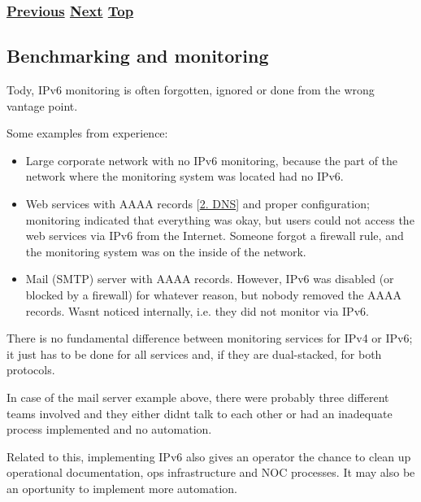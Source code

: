 \documentclass[
]{article}
\begin{document}
\subsubsection{\texorpdfstring{\hyperref[address-and-prefix-management]{Previous}
\hyperref[benchmarking-and-monitoring]{Next}
\hyperref[management-and-operations]{Top}}{Previous Next Top}}\label{previous-next-top-26}

\pagebreak

\subsection{Benchmarking and
monitoring}\label{benchmarking-and-monitoring}

Tody, IPv6 monitoring is often forgotten, ignored or done from the wrong
vantage point.

Some examples from experience:

\begin{itemize}
\item
  Large corporate network with no IPv6 monitoring, because the part of
  the network where the monitoring system was located had no IPv6.
\item
  Web services with AAAA records {[}\hyperref[dns]{2. DNS}{]} and proper
  configuration; monitoring indicated that everything was okay, but
  users could not access the web services via IPv6 from the Internet.
  Someone forgot a firewall rule, and the monitoring system was on the
  inside of the network.
\item
  Mail (SMTP) server with AAAA records. However, IPv6 was disabled (or
  blocked by a firewall) for whatever reason, but nobody removed the
  AAAA records. Wasn\textquotesingle t noticed internally, i.e. they did
  not monitor via IPv6.
\end{itemize}

There is no fundamental difference between monitoring services for IPv4
or IPv6; it just has to be done for all services and, if they are
dual-stacked, for both protocols.

In case of the mail server example above, there were probably three
different teams involved and they either didn\textquotesingle t talk to
each other or had an inadequate process implemented and no automation.

Related to this, implementing IPv6 also gives an operator the chance to
clean up operational documentation, ops infrastructure and NOC
processes. It may also be an oportunity to implement more automation.
\end{document}
